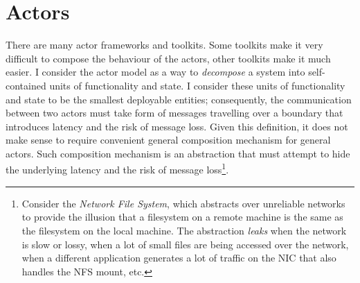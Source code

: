 \documentclass[10 pt, twocolumn]{article}
\begin{document}
\section{Actors}
There are many actor frameworks and toolkits\cite{akka,scalaz8,transient,thespian}. Some toolkits make it very difficult to compose the behaviour of the actors\cite{akka,thespian}, other toolkits make it much easier\cite{scalaz8,transient}. I consider the actor model as a way to \emph{decompose} a system into self-contained units of functionality and state. I consider these units of functionality and state to be the smallest deployable entities; consequently, the communication between two actors must take form of messages travelling over a boundary that introduces latency and the risk of message loss. Given this definition, it does not make sense to require convenient general composition mechanism for general actors. Such composition mechanism is an abstraction that must attempt to hide the underlying latency and the risk of message loss\footnote{Consider the \emph{Network File System}, which abstracts over unreliable networks to provide the illusion that a filesystem on a remote machine is the same as the filesystem on the local machine. The abstraction \emph{leaks} when the network is slow or lossy, when a lot of small files are being accessed over the network, when a different application generates a lot of traffic on the NIC that also handles the NFS mount, etc.}. 


\printbibliography
\end{document}
